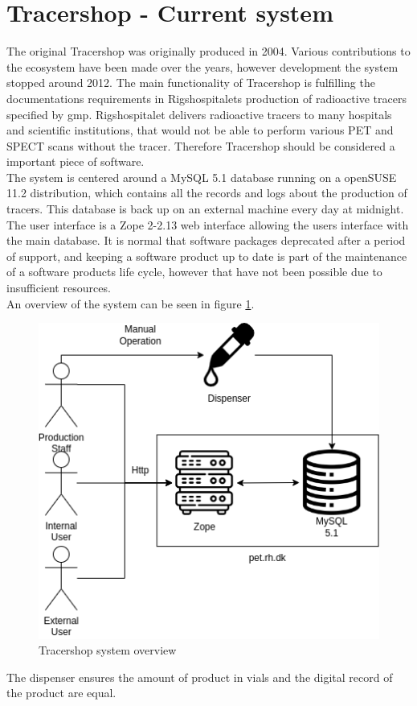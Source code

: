 \documentclass{article}
\begin{document}
\section*{Tracershop - Current system}
The original Tracershop was originally produced in 2004. Various contributions to the ecosystem have been made over the years,
however development the system stopped around 2012.
The main functionality of Tracershop is fulfilling the documentations requirements in Rigshospitalets production of radioactive tracers specified by \gls{gmp}.
Rigshospitalet delivers radioactive tracers to many hospitals and scientific institutions, that would not be able to perform various PET and SPECT scans without the tracer.
Therefore Tracershop should be considered a important piece of software.\\
The system is centered around a MySQL 5.1 database running on a openSUSE 11.2 distribution, which contains all the records and logs about the production of tracers. This database is back up on an external machine every day at midnight.
The user interface is a Zope 2-2.13 web interface allowing the users interface with the main database.
It is normal that software packages deprecated after a period of support, and keeping a software product up to date is part of the maintenance of a software products life cycle,
however that have not been possible due to insufficient resources.\\
An overview of the system can be seen in figure \ref{fig:oldsys}.
\begin{figure}[ht]
  \begin{center}
    \includegraphics[width=0.6\linewidth]{OldSetup.png}
    \caption{Tracershop system overview}
    \label{fig:oldsys}
  \end{center}
\end{figure}
The dispenser ensures the amount of product in vials and the digital record of the product are equal.
\end{document}
